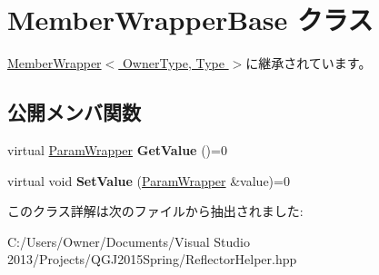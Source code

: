\hypertarget{class_member_wrapper_base}{}\section{Member\+Wrapper\+Base クラス}
\label{class_member_wrapper_base}


\hyperlink{class_member_wrapper}{Member\+Wrapper$<$ Owner\+Type, Type $>$}に継承されています。

\subsection*{公開メンバ関数}
\begin{DoxyCompactItemize}
\item 
virtual \hyperlink{struct_param_wrapper}{Param\+Wrapper} {\bfseries Get\+Value} ()=0\hypertarget{class_member_wrapper_base_a07c8eb47f2ca3eaa4083350cac6caf2c}{}\label{class_member_wrapper_base_a07c8eb47f2ca3eaa4083350cac6caf2c}

\item 
virtual void {\bfseries Set\+Value} (\hyperlink{struct_param_wrapper}{Param\+Wrapper} \&value)=0\hypertarget{class_member_wrapper_base_ad759419d563a570041c6397cad4787f6}{}\label{class_member_wrapper_base_ad759419d563a570041c6397cad4787f6}

\end{DoxyCompactItemize}


このクラス詳解は次のファイルから抽出されました\+:\begin{DoxyCompactItemize}
\item 
C\+:/\+Users/\+Owner/\+Documents/\+Visual Studio 2013/\+Projects/\+Q\+G\+J2015\+Spring/Reflector\+Helper.\+hpp\end{DoxyCompactItemize}
